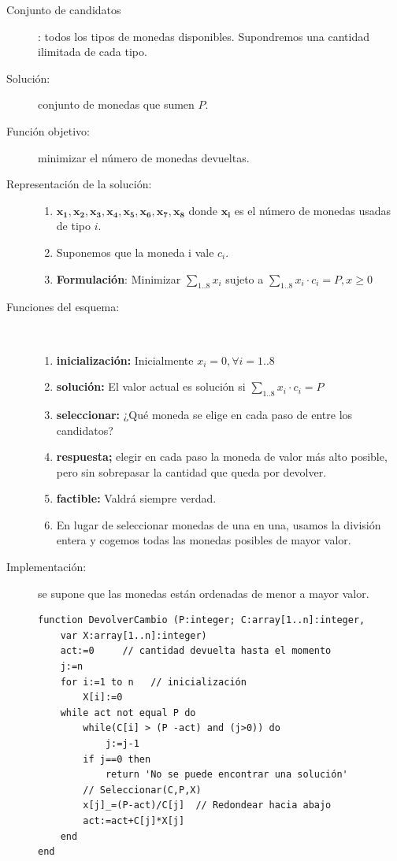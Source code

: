 \documentclass[10pt,a4paper,spanish]{report}
\theoremstyle{definition}
\theoremstyle{remark}
\begin{document}
\begin{enumerate}[$\bullet$]
    \begin{description}
        \item[Conjunto de candidatos]: todos los tipos de monedas disponibles. Supondremos una cantidad ilimitada de cada tipo.
        \item[Solución:] conjunto de monedas que sumen $P$.
        \item[Función objetivo:] minimizar el número de monedas devueltas.
        \item[Representación de la solución:]
        \begin{enumerate}[$\bullet$]
            \item $\mathbf{x_1,x_2,x_3,x_4,x_5,x_6,x_7,x_8}$ donde $\mathbf{x_i}$ es el número de monedas usadas de tipo $i$.
            \item Suponemos que la moneda i vale $c_i$.
            \item \textbf{Formulación}: Minimizar $\sum_{1..8}x_i$ sujeto a $\sum_{1..8}x_i\cdot c_i = P, x\ge0$
        \end{enumerate}
        \item [Funciones del esquema:]~\\
        \begin{enumerate}
            \item \textbf{inicialización:} Inicialmente $x_i=0, \forall i = 1..8$
            \item \textbf{solución:} El valor actual es solución si $\sum_{1..8}x_i \cdot c_i = P$
            \item \textbf{seleccionar:} ¿Qué moneda se elige en cada paso de entre los candidatos?
            \item \textbf{respuesta;} elegir en cada paso la moneda de valor más alto posible, pero sin sobrepasar la cantidad que queda por devolver.
            \item \textbf{factible:} Valdrá siempre verdad.
            \item En lugar de seleccionar monedas de una en una, usamos la división entera y cogemos todas las monedas posibles de mayor valor.
        \end{enumerate}
        \item[Implementación:] se supone que las monedas están ordenadas de menor a mayor valor.
        \begin{verbatim}
function DevolverCambio (P:integer; C:array[1..n]:integer, 
    var X:array[1..n]:integer)
    act:=0     // cantidad devuelta hasta el momento
    j:=n
    for i:=1 to n   // inicialización
        X[i]:=0
    while act not equal P do
        while(C[i] > (P -act) and (j>0)) do
            j:=j-1
        if j==0 then
            return 'No se puede encontrar una solución'
        // Seleccionar(C,P,X)
        x[j]_=(P-act)/C[j]  // Redondear hacia abajo
        act:=act+C[j]*X[j]
    end
end
        \end{verbatim}
    \end{description}
\end{enumerate}
\end{document}
